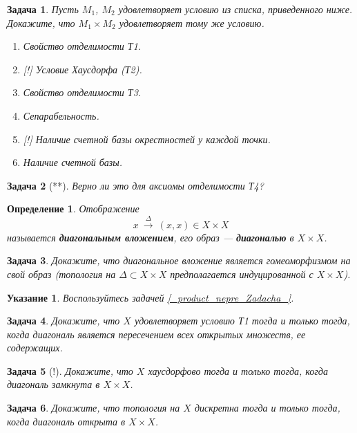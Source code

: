 \documentclass[12pt]{book}
\newcommand{\arrow}{{\:\longrightarrow\:}}
\theoremstyle{upshape}
\newtheorem{zadacha}{Задача}[chapter]
\theoremstyle{generic}
\newtheorem{opredelenie}[teorema]{Определение}
\theoremstyle{upshapenonumber}
\newtheorem{ukazanie}{Указание}[section]
\newcommand{\следствие}{%
     \refstepcounter{teorema}
     {\noindent\bf Следствие \thechapter.\arabic{teorema}:\ }}
\newcommand{\пример}{%
     \refstepcounter{teorema}
     {\noindent\bf Пример \thechapter.\arabic{teorema}:\ }}
\newcommand{\лемма}{%
     \refstepcounter{teorema}
     {\noindent\bf Лемма \thechapter.\arabic{teorema}:\ }}
\newcommand{\теорема}{%
     \refstepcounter{teorema}
     {\noindent\bf Теорема \thechapter.\arabic{teorema}:\ }}
\newcommand{\утверждение}{%
     \refstepcounter{teorema}
     {\noindent\bf Утверждение \thechapter.\arabic{teorema}:\ }}
\def\ит{\it}
\def\итем{\item %
}
\begin{document}
{\begin{zadacha} 
Пусть $M_1$, $M_2$ удовлетворяет условию из списка,
приведенного ниже. Докажите, что $M_1\times M_2$ 
удовлетворяет тому же условию.
\begin{enumerate}
\итем Свойство отделимости Т1.

\итем[!] Условие Хаусдорфа (Т2).

\итем Свойство отделимости Т3.

\итем Сепарабельность.

\итем[!] Наличие счетной базы окрестностей у каждой точки.

\итем Наличие счетной базы.
\end{enumerate}
\end{zadacha}

\begin{zadacha}[**]
Верно ли это для аксиомы отделимости Т4? 
\end{zadacha}

\begin{opredelenie}
Отображение \[ x\overset{\Delta}{\arrow} (x,x)\in X\times X\]
называется {\bf диагональным вложением}, его образ --- {\bf
диагональю} в $X\times X$.
\end{opredelenie}

\begin{zadacha}
Докажите, что диагональное вложение является гомеоморфизмом на свой
образ (топология на $\Delta\subset X\times X$ предполагается
индуцированной с $X\times X$).
\end{zadacha}

\begin{ukazanie}
Воспользуйтесь задачей \ref{_product_nepre_Zadacha_}.
\end{ukazanie}

\begin{zadacha}
Докажите, что $X$ удовлетворяет условию Т1 тогда и только тогда,
когда диагональ является пересечением всех открытых множеств, ее
содержащих.
\end{zadacha}

\begin{zadacha}[!]
Докажите, что $X$ хаусдорфово тогда и только тогда, когда диагональ
замкнута в $X\times X$.
\end{zadacha}

\begin{zadacha}
Докажите, что топология на $X$ дискретна 
тогда и только тогда, когда диагональ открыта в $X\times X$.
\end{zadacha}

}
\end{document}
